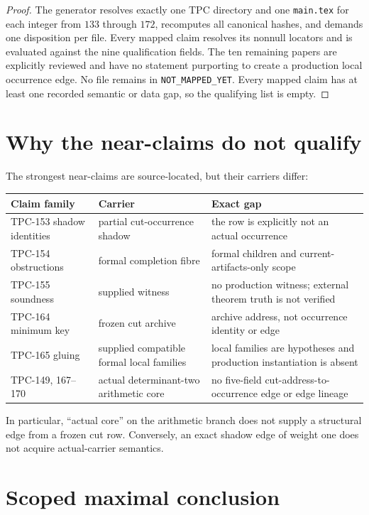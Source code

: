 \documentclass[11pt]{article}
\begin{document}
\begin{proof}
The generator resolves exactly one TPC directory and one
\texttt{main.tex} for each integer from \(133\) through \(172\), recomputes
all canonical hashes, and demands one disposition per file.  Every mapped
claim resolves its nonnull locators and is evaluated against the nine
qualification fields.  The ten remaining papers are explicitly reviewed
and have no statement purporting to create a production local occurrence
edge.  No file remains in \texttt{NOT\_MAPPED\_YET}.  Every mapped claim has
at least one recorded semantic or data gap, so the qualifying list is
empty.
\end{proof}

\section{Why the near-claims do not qualify}

The strongest near-claims are source-located, but their carriers differ:
\begin{center}
\small
\begin{tabularx}{\textwidth}{@{}lYY@{}}
\toprule
Claim family & Carrier & Exact gap\\
\midrule
TPC-153 shadow identities & partial cut-occurrence shadow &
the row is explicitly not an actual occurrence\\
TPC-154 obstructions & formal completion fibre &
formal children and current-artifacts-only scope\\
TPC-155 soundness & supplied witness &
no production witness; external theorem truth is not verified\\
TPC-164 minimum key & frozen cut archive &
archive address, not occurrence identity or edge\\
TPC-165 gluing & supplied compatible formal local families &
local families are hypotheses and production instantiation is absent\\
TPC-149, 167--170 & actual determinant-two arithmetic core &
no five-field cut-address-to-occurrence edge or edge lineage\\
\bottomrule
\end{tabularx}
\end{center}

In particular, ``actual core'' on the arithmetic branch does not supply a
structural edge from a frozen cut row.  Conversely, an exact shadow edge of
weight one does not acquire actual-carrier semantics.

\section{Scoped maximal conclusion}
\end{document}
